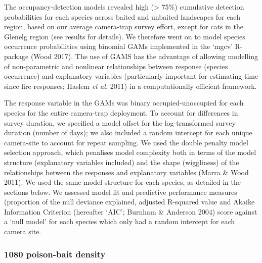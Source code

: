\documentclass[11pt,a4paper,titlepage,twoside,openright]{style/unimelbthesis}
\begin{document}
\begin{mainmatter}
The occupancy-detection models revealed high (\textgreater{} 75\%) cumulative detection probabilities for each species across baited and unbaited landscapes for each region, based on our average camera-trap survey effort, except for cats in the Glenelg region (see results for details). We therefore went on to model species occurrence probabilities using binomial GAMs implemented in the `mgcv' R-package (Wood 2017). The use of GAMS has the advantage of allowing modelling of non-parametric and nonlinear relationships between response (species occurrence) and explanatory variables (particularly important for estimating time since fire responses; Haslem \emph{et al.} 2011) in a computationally efficient framework.

The response variable in the GAMs was binary occupied-unoccupied for each species for the entire camera-trap deployment. To account for differences in survey duration, we specified a model offset for the log-transformed survey duration (number of days); we also included a random intercept for each unique camera-site to account for repeat sampling. We used the double penalty model selection approach, which penalises model complexity both in terms of the model structure (explanatory variables included) and the shape (wiggliness) of the relationships between the responses and explanatory variables (Marra \& Wood 2011). We used the same model structure for each species, as detailed in the sections below. We assessed model fit and predictive performance measures (proportion of the null deviance explained, adjusted R-squared value and Akaike Information Criterion (hereafter `AIC'; Burnham \& Anderson 2004) score against a `null model' for each species which only had a random intercept for each camera site.

\hypertarget{poison-bait-density}{%
\subsubsection{1080 poison-bait density}\label{poison-bait-density}}


\end{mainmatter}
\end{document}
